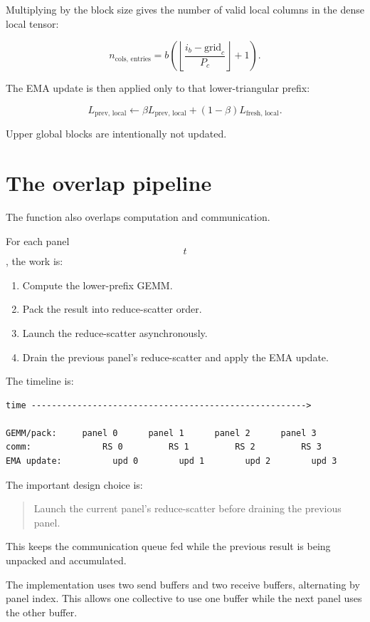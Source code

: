 \documentclass[11pt]{article}
\begin{document}
Multiplying by the block size gives the number of valid local columns in the dense local tensor:

$$
n_{\text{cols, entries}}
=
b
\left(
\left\lfloor
\frac{i_b - \text{grid}_c}{P_c}
\right\rfloor
+ 1
\right).
$$

The EMA update is then applied only to that lower-triangular prefix:

$$
L_{\text{prev, local}}
\leftarrow
\beta L_{\text{prev, local}}
+
(1-\beta)L_{\text{fresh, local}}.
$$

Upper global blocks are intentionally not updated.

\section{The overlap pipeline}

The function also overlaps computation and communication.

For each panel $$t$$, the work is:

\begin{enumerate}
    \item Compute the lower-prefix GEMM.
    \item Pack the result into reduce-scatter order.
    \item Launch the reduce-scatter asynchronously.
    \item Drain the previous panel's reduce-scatter and apply the EMA update.
\end{enumerate}

The timeline is:

\begin{lstlisting}
time ------------------------------------------------------>

GEMM/pack:     panel 0      panel 1      panel 2      panel 3
comm:              RS 0         RS 1         RS 2         RS 3
EMA update:          upd 0        upd 1        upd 2        upd 3
\end{lstlisting}

The important design choice is:

\begin{quote}
Launch the current panel's reduce-scatter before draining the previous panel.
\end{quote}

This keeps the communication queue fed while the previous result is being unpacked and accumulated.

The implementation uses two send buffers and two receive buffers, alternating by panel index. This allows one collective to use one buffer while the next panel uses the other buffer.
\end{document}
